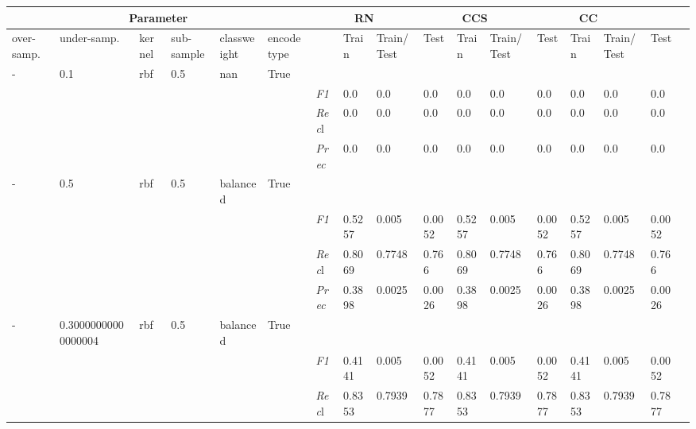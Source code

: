     \begin{table}[]
    \tiny
    \tabcolsep=0.11cm
    \begin{tabularx}{\textwidth}{XXXXXX|X|XXX|XXX|XXXX}
    \toprule
    \multicolumn{6}{c}{Parameter} & \multicolumn{3}{c}{RN} & \multicolumn{3}{c}{CCS} & \multicolumn{3}{c}{CC} \\ \midrule
    over-\newline samp. & under-\newline samp. & kernel &sub-\newline sample & class\newline weight & encode\newline type & & Train & Train/\newline Test & Test & Train & Train/\newline Test & Test & Train & Train/\newline Test & Test \\ \midrule
    - & 0.1 & rbf & 0.5 & nan &True & & & & & & & & & \\
    & & & & & & \textit{F1} & 0.0 & 0.0 & 0.0 & 0.0 & 0.0        & 0.0        & 0.0        & 0.0        & 0.0        \\
    & & & & & & \textit{Rec}l & 0.0 & 0.0 & 0.0    & 0.0 & 0.0    & 0.0    & 0.0    & 0.0    & 0.0    \\
    & & & & & & \textit{Prec} & 0.0 & 0.0 & 0.0 & 0.0 & 0.0 & 0.0 & 0.0 & 0.0 & 0.0 \\ \midrule
    - & 0.5 & rbf & 0.5 & balanced &True & & & & & & & & & \\
    & & & & & & \textit{F1} & 0.5257 & 0.005 & 0.0052 & 0.5257 & 0.005        & 0.0052        & 0.5257        & 0.005        & 0.0052        \\
    & & & & & & \textit{Rec}l & 0.8069 & 0.7748 & 0.766    & 0.8069 & 0.7748    & 0.766    & 0.8069    & 0.7748    & 0.766    \\
    & & & & & & \textit{Prec} & 0.3898 & 0.0025 & 0.0026 & 0.3898 & 0.0025 & 0.0026 & 0.3898 & 0.0025 & 0.0026 \\ \midrule
    - & 0.30000000000000004 & rbf & 0.5 & balanced &True & & & & & & & & & \\
    & & & & & & \textit{F1} & 0.4141 & 0.005 & 0.0052 & 0.4141 & 0.005        & 0.0052        & 0.4141        & 0.005        & 0.0052        \\
    & & & & & & \textit{Rec}l & 0.8353 & 0.7939 & 0.7877    & 0.8353 & 0.7939    & 0.7877    & 0.8353    & 0.7939    & 0.7877    \\

\end{tabularx}
\end{table}

